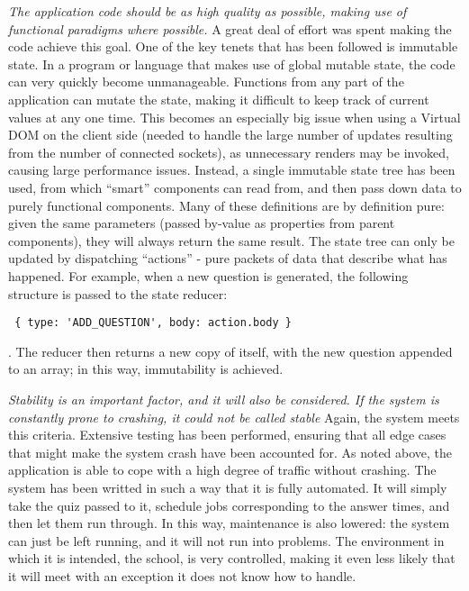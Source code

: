 \textit{The application code should be as high quality as possible, making use of functional paradigms where possible.} A great deal of effort was spent making the code achieve this goal. One of the key tenets that has been followed is immutable state. In a program or language that makes use of global mutable state, the code can very quickly become unmanageable. Functions from any part of the application can mutate the state, making it difficult to keep track of current values at any one time. This becomes an especially big issue when using a Virtual DOM on the client side (needed to handle the large number of updates resulting from the number of connected sockets), as unnecessary renders may be invoked, causing large performance issues. Instead, a single immutable state tree has been used, from which ``smart'' components can read from, and then pass down data to purely functional components. Many of these definitions are by definition pure: given the same parameters (passed by-value as properties from parent components), they will always return the same result. The state tree can only be updated by dispatching ``actions'' - pure packets of data that describe what has happened. For example, when a new question is generated, the following structure is passed to the state reducer: \begin{verbatim} { type: 'ADD_QUESTION', body: action.body } \end{verbatim}. The reducer then returns a new copy of itself, with the new question appended to an array; in this way, immutability is achieved.

\textit{Stability is an important factor, and it will also be considered. If the system is constantly prone to crashing, it could not be called stable} Again, the system meets this criteria. Extensive testing has been performed, ensuring that all edge cases that might make the system crash have been accounted for. As noted above, the application is able to cope with a high degree of traffic without crashing. The system has been writted in such a way that it is fully automated. It will simply take the quiz passed to it, schedule jobs corresponding to the answer times, and then let them run through. In this way, maintenance is also lowered: the system can just be left running, and it will not run into problems. The environment in which it is intended, the school, is very controlled, making it even less likely that it will meet with an exception it does not know how to handle.
